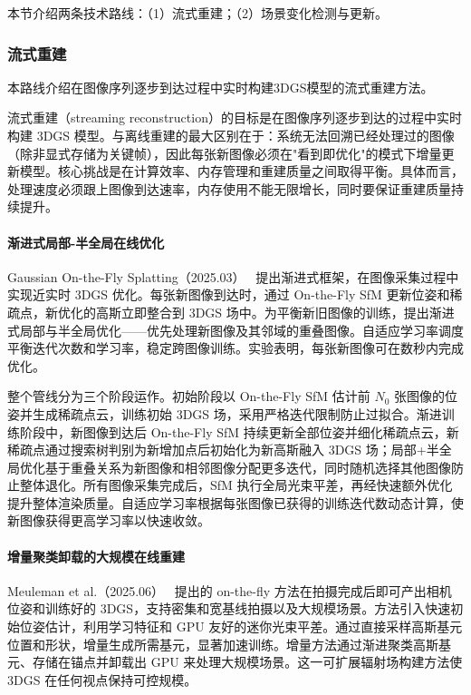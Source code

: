 本节介绍两条技术路线：（1）流式重建；（2）场景变化检测与更新。

\subsubsection{流式重建}

本路线介绍在图像序列逐步到达过程中实时构建3DGS模型的流式重建方法。

流式重建（streaming reconstruction）的目标是在图像序列逐步到达的过程中实时构建 3DGS 模型。与离线重建的最大区别在于：系统无法回溯已经处理过的图像（除非显式存储为关键帧），因此每张新图像必须在"看到即优化"的模式下增量更新模型。核心挑战是在计算效率、内存管理和重建质量之间取得平衡。具体而言，处理速度必须跟上图像到达速率，内存使用不能无限增长，同时要保证重建质量持续提升。

\paragraph{渐进式局部-半全局在线优化}

Gaussian On-the-Fly Splatting（2025.03）~\cite{2503_13086} 提出渐进式框架，在图像采集过程中实现近实时 3DGS 优化。每张新图像到达时，通过 On-the-Fly SfM 更新位姿和稀疏点，新优化的高斯立即整合到 3DGS 场中。为平衡新旧图像的训练，提出渐进式局部与半全局优化——优先处理新图像及其邻域的重叠图像。自适应学习率调度平衡迭代次数和学习率，稳定跨图像训练。实验表明，每张新图像可在数秒内完成优化。

整个管线分为三个阶段运作。初始阶段以 On-the-Fly SfM 估计前 $N_0$ 张图像的位姿并生成稀疏点云，训练初始 3DGS 场，采用严格迭代限制防止过拟合。渐进训练阶段中，新图像到达后 On-the-Fly SfM 持续更新全部位姿并细化稀疏点云，新稀疏点通过搜索树判别为新增加点后初始化为新高斯融入 3DGS 场；局部+半全局优化基于重叠关系为新图像和相邻图像分配更多迭代，同时随机选择其他图像防止整体退化。所有图像采集完成后，SfM 执行全局光束平差，再经快速额外优化提升整体渲染质量。自适应学习率根据每张图像已获得的训练迭代数动态计算，使新图像获得更高学习率以快速收敛。

\paragraph{增量聚类卸载的大规模在线重建}

Meuleman et al.（2025.06）~\cite{2506_05558} 提出的 on-the-fly 方法在拍摄完成后即可产出相机位姿和训练好的 3DGS，支持密集和宽基线拍摄以及大规模场景。方法引入快速初始位姿估计，利用学习特征和 GPU 友好的迷你光束平差。通过直接采样高斯基元位置和形状，增量生成所需基元，显著加速训练。增量方法通过渐进聚类高斯基元、存储在锚点并卸载出 GPU 来处理大规模场景。这一可扩展辐射场构建方法使 3DGS 在任何视点保持可控规模。

